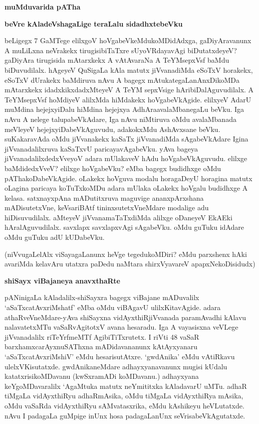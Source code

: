 \noindent
\textbf{muMduvarida pATha}

\noindent
\textbf{beVre kAladeVshagaLige teraLalu sidadhxtebeVku}\label{page126}

beLigegx 7 GaMTege elilxgoV hoVgabeVkeMdukoMDidAdxga, gaDiyAravanunx A muLiLxna neVrakekx tirugisibiTaTxre sUyoVRdayavAgi biDutatxdeyeV? gaDiyAra tirugisida mAtarxkekx A vAtAvaraNa A TeYMsepxVsf baMdu biDuvudilalx. hAgeyeV QuSigaLa kAla matutx jiVvanadiMda eSoTxV horakekx, eSoTxV dUrakekx baMdiruva nAvu A bagegx mAtukategaLanAnxDikoMDa mAtarxkekx idadxkikxdadxMteyeV A TeYM sepxVsige hAribiDalAguvudilalx. A TeYMsepxVsf hoMdiyeV alilxMda hiMdakekx hoVgabeVkAgide. elilxyeV AdarU muMdina hejejxyiDalu hiMdina hejejxya AdhAraavalaMbanegaLu beVku. Iga nAvu A nelege talupabeVkAdare, Iga nAvu niMtiruva oMdu avalaMbanada meVleyeV hejejxyiDabeVkAguvudu, adakokxMdu AshAvxsane beVku. suKakaravAda oMdu jiVvanakekx kaSaTx jiVvanadiMda sAgabeVkAdare Igina jiVvanadalilxruva kaSaTxvU paricayavAgabeVku. yAva bageya jiVvanadalilxdedxVveyoV adara mUlakaveV hAdu 
hoVgabeVkAguvudu. elilxge baMdidedxVveV? elilxge hoVgabeVku? eMba bagegx budidhxge oMdu pAThakoDabeVkAgide. oLakekx hoVguva modalu horagaDeyU horagina matutx oLagina paricaya koTuTxkoMDu adara mUlaka oLakekx hoVgalu budidhxge A kelasa. satxnayxpAna mADutitxruva maguvige ananxpArxshana mADisutetxVne, keVsariBAtf tininxsutetxVneMdare modalige adu hiDisuvudilalx. aMteyeV jiVvanamaTaTxdiMda alilxge oDaneyeV EkAEki hAralAguvudilalx. savxlapx savxlapxvAgi sAgabeVku. oMdu guTuku idAdare oMdu guTuku adU kUDabeVku.

(niVvugaLelAlx viSayagaLanunx heVge tegedukoMDiri? eMdu parxshenx hAki avariMda kelavAru utatxra paDedu naMtara shirxVyavareV apapxNekoDisidudx)

\noindent
\textbf{shiSayx viBajaneya anavxthaRte}\label{page126}

pANinigaLa kAladalilx-shiSayxra bagegx viBajane mADuvalilx `aSaTxcatAvxriMshatf' eMba oMdu viBAgavU ulilxKitavAgide. adara athaRveVneMdare-yAva shiSayxna vidAyxthiRjiVvanada paramAvadhi kAlavu nalavatetxMTu vaSaRvAgitotxV avana hesaradu. Iga A vayasisxna veVLege jiVvanadalilx riTeYrfmeMTf AgibiTiTxrutetx. I riVti 48 vaSaR barxhamxcarAyxnuSAThxna mADidavananunx kAtAyxyanaru `aSaTxcatAvxriMshiV' eMdu hesarisutAtxre. `gwdAnika' eMdu vAtiRkavu ulelxVKisutatxde. gwdAnikaneMdare adhayxyanavanunx mugisi kUdalu katatxrisikoMDavanu (kwSxramADi koMDavanu.) adhayxyana keYgoMDavaralilx `AgaMtuka matutx neYmititxka kAladavarU uMTu. adhaR tiMgaLa vidAyxthiRyu adhaRmAsika, oMdu tiMgaLa vidAyxthiRya mAsika, oMdu vaSaRda vidAyxthiRyu sAMvatasxrika, eMdu kAshikeyu heVLutatxde. nAvu I padagaLa guMpige inUnx hosa padagaLanUnx seVrisabeVkAgutatxde.

